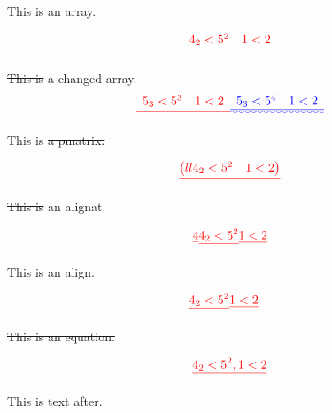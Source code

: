 \documentclass{article}
\providecommand{\DIFadd}[1]{{\protect\color{blue}\uwave{#1}}} %
\providecommand{\DIFdel}[1]{{\protect\color{red}\sout{#1}}}                      %
\providecommand{\DIFaddbegin}{} %
\providecommand{\DIFaddend}{} %
\providecommand{\DIFdelbegin}{} %
\providecommand{\DIFdelend}{} %
\begin{document}
This is \DIFdelbegin \DIFdel{an array.
}%

\[\DIFdel{
\begin{array}{ll}
 4_2  < 5^2 & 1 < 2 \\
\end{array}
}\]

\DIFdel{This is }\DIFdelend a changed array.
\[\DIFdelbegin \DIFdel{
\begin{array}{ll}
 5_3  < 5^3 & 1 < 2 \\
\end{array}
}\DIFdelend \DIFaddbegin \DIFadd{
\begin{array}{ll}
 5_3  < 5^4 & 1 < 2 \\\hline
\end{array}
}\DIFaddend \]

This is \DIFdelbegin \DIFdel{a pmatrix.
}%

\[\DIFdel{
\begin{pmatrix}{ll}
 4_2  < 5^2 & 1 < 2 \\
\end{pmatrix}
}\]

\DIFdel{This is }\DIFdelend an alignat.
\DIFdelbegin %

\begin{align*}{\DIFdel{4}}
 \DIFdel{4_2  < 5^2 }& \DIFdel{1 < 2 }\\
\end{align*}

\DIFdel{This is an align.
}%

\begin{align*}\DIFdel{
 4_2  < 5^2 }& \DIFdel{1 < 2 
}\end{align*}

\DIFdel{This is an equation.
}%

\begin{displaymath}\DIFdel{
 4_2  < 5^2 , 1 < 2 }\\
\end{displaymath}
\DIFdelend 

This is text after.
\end{document}
